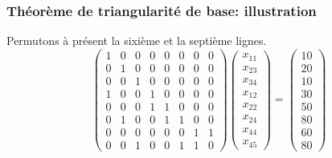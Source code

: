 \documentclass[usepdftitle=false]{beamer}
\begin{document}
\begin{frame}
\frametitle{Théorème de triangularité de base: illustration}

Permutons à présent la sixième et la septième lignes.
\[
\begin{pmatrix}
 1 & 0 & 0 & 0 & 0 & 0 & 0 & 0 \\
 0 & 1 & 0 & 0 & 0 & 0 & 0 & 0 \\
 0 & 0 & 1 & 0 & 0 & 0 & 0 & 0 \\
 1 & 0 & 0 & 1 & 0 & 0 & 0 & 0 \\
 0 & 0 & 0 & 1 & 1 & 0 & 0 & 0 \\
 0 & 1 & 0 & 0 & 1 & 1 & 0 & 0 \\
 0 & 0 & 0 & 0 & 0 & 0 & 1 & 1 \\
 0 & 0 & 1 & 0 & 0 & 1 & 1 & 0
\end{pmatrix}
\begin{pmatrix}
x_{11} \\
x_{23} \\
x_{34} \\
x_{12} \\
x_{22} \\
x_{24} \\
x_{44} \\
x_{45}
\end{pmatrix}
=
\begin{pmatrix}
10 \\
20 \\
10 \\
30 \\
50 \\
80 \\
60 \\
80
\end{pmatrix}
\]

\end{frame}
\end{document}
